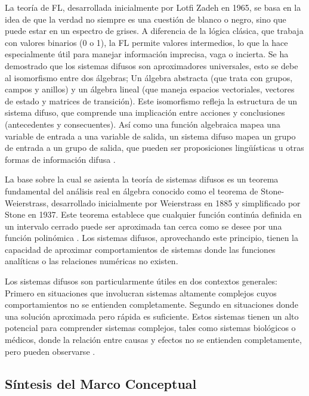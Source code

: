 La teoría de FL, desarrollada inicialmente por Lotfi Zadeh en 1965, se basa en la idea de que la verdad no siempre es una cuestión de blanco o negro, sino que puede estar en un espectro de grises. A diferencia de la lógica clásica, que trabaja con valores binarios (0 o 1), la FL permite valores intermedios, lo que la hace especialmente útil para manejar información imprecisa, vaga o incierta. Se ha demostrado que los sistemas difusos son aproximadores universales, esto se debe al isomorfismo entre dos álgebras; Un álgebra abstracta (que trata con grupos, campos y anillos) y un álgebra lineal (que maneja espacios vectoriales, vectores de estado y matrices de transición). Este isomorfismo refleja la estructura de un sistema difuso, que comprende una implicación entre acciones y conclusiones (antecedentes y consecuentes). Así como una función algebraica mapea una variable de entrada a una variable de salida, un sistema difuso mapea un grupo de entrada a un grupo de salida, que pueden ser proposiciones lingüísticas u otras formas de información difusa \citep{Ross2010}.

La base sobre la cual se asienta la teoría de sistemas difusos es un teorema fundamental del análisis real en álgebra conocido como el teorema de Stone-Weierstrass, desarrollado inicialmente por Weierstrass en 1885 y simplificado por Stone en 1937. Este teorema establece que cualquier función continúa definida en un intervalo cerrado puede ser aproximada tan cerca como se desee por una función polinómica \citep{Ross2010,Gupta2011Tribute}. Los sistemas difusos, aprovechando este principio, tienen la capacidad de aproximar comportamientos de sistemas donde las funciones analíticas o las relaciones numéricas no existen.

Los sistemas difusos son particularmente útiles en dos contextos generales: Primero en situaciones que involucran sistemas altamente complejos cuyos comportamientos no se entienden completamente. Segundo en situaciones donde una solución aproximada pero rápida es suficiente. Estos sistemas tienen un alto potencial para comprender sistemas complejos, tales como sistemas biológicos o médicos, donde la relación entre causas y efectos no se entienden completamente, pero pueden observarse \citep{Kaur2022}.

\subsection{Síntesis del Marco Conceptual}
\label{subsec:sintesis_marco_conceptual}

